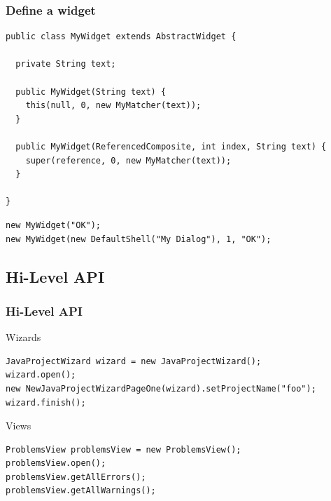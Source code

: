 \documentclass{beamer}
\begin{document}
\begin{frame}[fragile]
\frametitle{Define a widget}
\begin{lstlisting}
public class MyWidget extends AbstractWidget {

  private String text;

  public MyWidget(String text) {
    this(null, 0, new MyMatcher(text));
  }

  public MyWidget(ReferencedComposite, int index, String text) {
    super(reference, 0, new MyMatcher(text));
  }

}
\end{lstlisting}
\begin{lstlisting}
new MyWidget("OK");
new MyWidget(new DefaultShell("My Dialog"), 1, "OK");  
\end{lstlisting}
\end{frame}

\subsection{Hi-Level API}
\begin{frame}[fragile]
\frametitle{Hi-Level API}
Wizards
\begin{lstlisting}
JavaProjectWizard wizard = new JavaProjectWizard();
wizard.open();
new NewJavaProjectWizardPageOne(wizard).setProjectName("foo");
wizard.finish();
\end{lstlisting}
\vspace{0.5cm}
Views
\begin{lstlisting}
ProblemsView problemsView = new ProblemsView();
problemsView.open();
problemsView.getAllErrors();
problemsView.getAllWarnings();
\end{lstlisting}
\end{frame}
\end{document}
